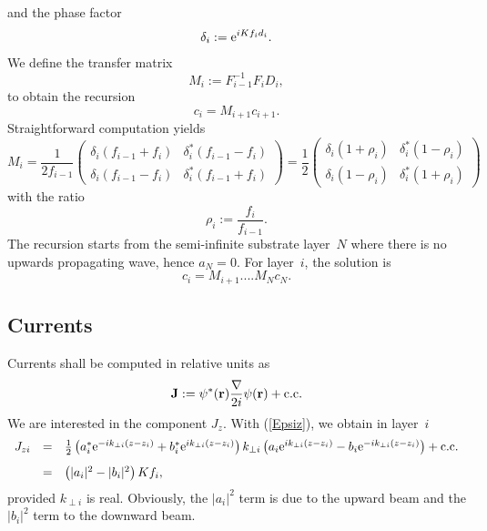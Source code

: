 and the phase factor
\begin{equation}
   \delta_i := \text{e}^{iKf_id_i}.
\end{equation}
We define the transfer matrix
\begin{equation}\label{Edef_M}
  M_i
  := F_{i-1}^{-1}F_i D_i,
\end{equation}
to obtain the recursion 
\begin{equation}\label{EcMc}
  c_i = M_{i+1} c_{i+1}.
\end{equation}
Straightforward computation yields
\begin{equation}
  M_i
   = \frac{1}{2f_{i-1}}
   \left(\begin{array}{cc}
       \delta_i(f_{i-1}+f_{i})&\delta_i^*(f_{i-1}-f_{i})\\
       \delta_i(f_{i-1}-f_{i})&\delta_i^*(f_{i-1}+f_{i})
   \end{array}\right)
   = \frac{1}{2}
   \left(\begin{array}{cc}
       \delta_i(1+\rho_{i})&\delta_i^*(1-\rho_{i})\\
       \delta_i(1-\rho_{i})&\delta_i^*(1+\rho_{i})
   \end{array}\right)
\end{equation}
with the ratio
\begin{equation}
  \rho_i := \frac{f_{i}}{f_{i-1}}.
\end{equation}
The recursion starts from the semi-infinite substrate layer~$N$
where there is no upwards propagating wave, hence $a_N=0$.
For layer~$i$, the solution is
\begin{equation}\label{Eci}
  c_i
  =
  M_{i+1}.... M_{N} c_N.  %
\end{equation}

\subsection{Currents}

Currents shall be computed in relative units as
\begin{equation}
  \mathbf{J}:=\psi^*(\mathbf{r})\frac{\mathbf{\nabla}}{2i}\psi(\mathbf{r})+\text{c.c.}
\end{equation}
We are interested in the component $J_z$.
With (\ref{Epsiz}),
we obtain in layer~$i$
\begin{equation}\label{EJperp}
  \begin{array}{lcl}
  J_{zi} &=& \frac{1}{2}
  \left( a_i^*\text{e}^{-ik_{\perp i}(z-z_i)} + b_i^*\text{e}^{ik_{\perp i}(z-z_i)} \right)
  k_{\perp i}
  \left( a_i\text{e}^{ik_{\perp i}(z-z_i)} - b_i\text{e}^{-ik_{\perp i}(z-z_i)} \right)
  +\text{c.c.}\\[2ex]
  &=& \left( |a_i|^2 - |b_i|^2 \right) K f_i,
  \end{array}
\end{equation}
provided $k_{\perp i}$ is real.
Obviously,
the $|a_i|^2$ term is due to the upward beam
and the $|b_i|^2$ term to the downward beam.


